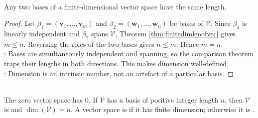 \begin{theorem} \label{thm:basis-length-well-defined} \\
Any two bases of a finite-dimensional vector space have the same length.
\begin{proof}
Let $\beta_1=(\mathbf{v}_1,\ldots,\mathbf{v}_m)$ and $\beta_2=(\mathbf{w}_1,\ldots,\mathbf{w}_n)$ be bases of $\mathcal{V}$. Since $\beta_1$ is linearly independent and $\beta_2$ spans $\mathcal{V}$, Theorem \ref{thm:finitedimlenofvec} gives $m\leq n$. Reversing the roles of the two bases gives $n\leq m$. Hence $m=n$.\\
: Bases are simultaneously independent and spanning, so the comparison theorem traps their lengths in both directions. This makes dimension well-defined.\\
: Dimension is an intrinsic number, not an artefact of a particular basis.
\end{proof}
\end{theorem}

\begin{definition} \\
The zero vector space has  $0$. If $\mathcal{V}$ has a basis of positive integer length $n$, then $\mathcal{V}$ is  and $\dim(\mathcal{V})=n$. A vector space is  if it has finite dimension; otherwise it is .
\end{definition}

